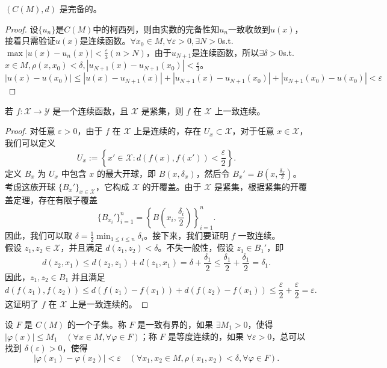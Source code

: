 \documentclass[lang=cn,newtx,10pt,scheme=chinese,thmcnt=chapter]{elegantbook}
\begin{document}
\begin{proposition}
\((C(M), d)\) 是完备的。
\end{proposition}
\begin{proof}
设$\{u_n\}$是$C(M)$中的柯西列，则由实数的完备性知$u_n$一致收敛到$u(x)$，接着只需验证$u(x)$是连续函数。$\forall x_0\in M,\forall \varepsilon>0,\exists N>0$s.t.$\max|u(x)-u_n(x)|<\frac{\varepsilon}{3}(n>N)$，由于$u_{N+1}$是连续函数，所以$\exists \delta>0$s.t.$x\in M,\rho(x,x_0)<\delta,|u_{N+1}(x)-u_{N+1}(x_0)|<\frac{\varepsilon}{3}$。
\[
|u(x)-u(x_0)|\leqslant |u(x)-u_{N+1}(x)|+|u_{N+1}(x)-u_{N+1}(x_0)|+|u_{N+1}(x_0)-u(x_0)|<\varepsilon
\]

\end{proof}
\begin{proposition}
  若 \( f: \mathscr{X} \to \mathscr{Y} \) 是一个连续函数，且 \( \mathscr{X} \) 是紧集，则 \( f \) 在 \( \mathscr{X} \) 上一致连续。  
\end{proposition}
\begin{proof}
对任意 \( \varepsilon > 0 \)，由于 \( f \) 在 \( \mathscr{X} \) 上是连续的，存在 \( U_x \subset \mathscr{X} \)，对于任意 \( x \in \mathscr{X} \)，我们可以定义
\[
U_x := \left\{ x' \in \mathscr{X} : d\left(f(x), f(x')\right) < \frac{\varepsilon}{2} \right\}.
\]
定义 \( B_x \) 为 \( U_x \) 中包含 \( x \) 的最大开球，即 \( B\left(x, \delta_x\right) \)，然后令 \( B_x' = B\left(x, \frac{\delta_x}{2}\right) \)。
考虑这族开球 \( \{ B_x' \}_{x \in \mathscr{X}} \)，它构成 \( \mathscr{X} \) 的开覆盖。由于 \( \mathscr{X} \) 是紧集，根据紧集的开覆盖定理，存在有限子覆盖
\[
\{ B_{x_i}' \}_{i=1}^n = \left\{ B\left(x_i, \frac{\delta_i}{2}\right) \right\}_{i=1}^n.
\]
因此，我们可以取 \( \delta = \frac{1}{2} \min_{1 \leqslant i \leqslant n} \delta_i \)。接下来，我们要证明 \( f \) 一致连续。\\
假设 \( z_1, z_2 \in \mathscr{X} \)，并且满足 \( d(z_1, z_2) < \delta \)。不失一般性，假设 \( z_1 \in B_1' \)，即
\[
d(z_2, x_1) \leqslant d(z_2, z_1) + d(z_1, x_1) = \delta + \frac{\delta_1}{2} \leqslant \frac{\delta_1}{2} + \frac{\delta_1}{2} = \delta_1.
\]
因此，\( z_1, z_2 \in B_1 \) 并且满足
\[
d\left(f(z_1), f(z_2)\right) \leqslant d\left(f(z_1) - f(x_1)\right) + d\left(f(z_2) - f(x_1)\right) \leqslant \frac{\varepsilon}{2} + \frac{\varepsilon}{2} = \varepsilon.
\]
这证明了 \( f \) 在 \( \mathscr{X} \) 上是一致连续的。
\end{proof}
\begin{definition}[一致有界和等度连续]
设 \( F \) 是 \( C(M) \) 的一个子集。称 \( F \) 是一致有界的，如果 \( \exists M_1 > 0 \)，使得 \( |\varphi(x)| \leqslant M_1 \quad (\forall x \in M, \forall \varphi \in F) \)；称 \( F \) 是等度连续的，如果 \( \forall \varepsilon > 0 \)，总可以找到 \( \delta(\varepsilon) > 0 \)，使得
\[
\left|\varphi(x_1) - \varphi(x_2)\right| < \varepsilon \quad (\forall x_1, x_2 \in M, \rho(x_1, x_2) < \delta, \forall \varphi \in F).
\]
\end{definition}
\end{document}
